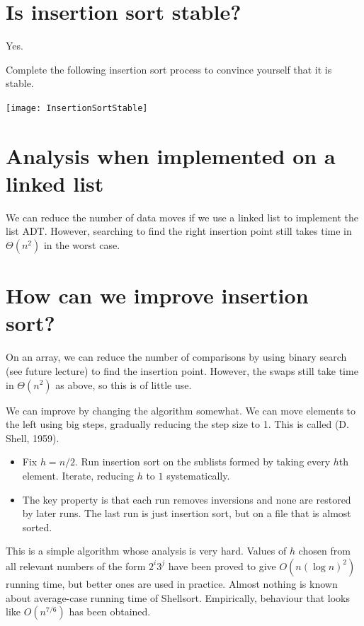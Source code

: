 \section{Is insertion sort stable?}
Yes.

\begin{Boxample}[0]
Complete the following insertion sort process to convince yourself that it is stable.
\begin{center}
\texttt{[image: InsertionSortStable]} 
\end{center}
\end{Boxample}

\section{Analysis when implemented on a linked list}
We can reduce the number of data moves if we use a linked list to implement 
the list ADT. However, searching to find the right insertion point still takes time in 
$\Theta(n^2)$ in the worst case.

\section{How can we improve insertion sort?}
On an array, we can reduce the number of comparisons by using binary search (see future lecture) to find 
the insertion point. However, the swaps still take time in $\Theta(n^2)$ as above, so this is of little use.

We can improve by changing the algorithm somewhat.
We can move elements to the left using big steps, gradually reducing the 
step size to 1. This is called  (D. Shell, 1959). 
\begin{itemize}
\item Fix $h = n/2$. Run insertion sort on the sublists formed by taking 
every $h$th element. Iterate, reducing $h$ to $1$ systematically. 
\item The key property is that each run removes inversions and none are 
restored by later runs. The last run is just insertion sort, but on a file that 
is almost sorted.
\end{itemize}
This is a simple algorithm whose analysis is very hard. 
Values of $h$ chosen from all relevant numbers of the form $2^i 3^j$ have been proved to give 
$O(n (\log n)^2)$ running time, but better ones are used in practice. 
Almost nothing is known about average-case running time of Shellsort. 
Empirically, behaviour that looks like $O(n^{7/6})$ has been obtained. 


